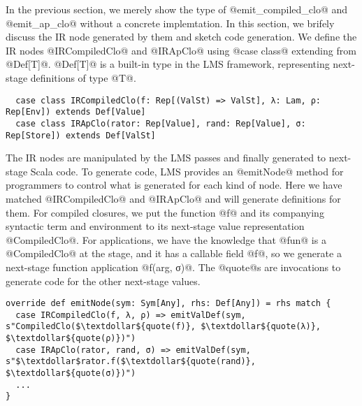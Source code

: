 In the previous section, we merely show the type of @emit_compiled_clo@ and
@emit_ap_clo@ without a concrete implemtation. In this section, we brifely
discuss the IR node generated by them and sketch code generation.
We define the IR nodes @IRCompiledClo@ and @IRApClo@ using @case class@
extending from @Def[T]@. @Def[T]@ is a built-in type in the LMS framework,
representing next-stage definitions of type @T@.

\begin{lstlisting}
  case class IRCompiledClo(f: Rep[(ValSt) => ValSt], λ: Lam, ρ: Rep[Env]) extends Def[Value]
  case class IRApClo(rator: Rep[Value], rand: Rep[Value], σ: Rep[Store]) extends Def[ValSt]
\end{lstlisting}

The IR nodes are manipulated by the LMS passes and finally generated to
next-stage Scala code. To generate code, LMS provides an @emitNode@ method for
programmers to control what is generated for each kind of node. Here we have
matched @IRCompiledClo@ and @IRApClo@ and will generate definitions for them.
For compiled closures, we put the function @f@ and its companying syntactic term
and environment to its next-stage value representation @CompiledClo@. For
applications, we have the knowledge that @fun@ is a @CompiledClo@ at the stage,
and it has a callable field @f@, so we generate a next-stage function
application @f(arg, σ)@. The @quote@s are invocations to generate code for the
other next-stage values.

\begin{lstlisting}
override def emitNode(sym: Sym[Any], rhs: Def[Any]) = rhs match {
  case IRCompiledClo(f, λ, ρ) => emitValDef(sym, s"CompiledClo($\textdollar${quote(f)}, $\textdollar${quote(λ)}, $\textdollar${quote(ρ)})")
  case IRApClo(rator, rand, σ) => emitValDef(sym, s"$\textdollar$rator.f($\textdollar${quote(rand)}, $\textdollar${quote(σ)})")
  ...
}
\end{lstlisting}
